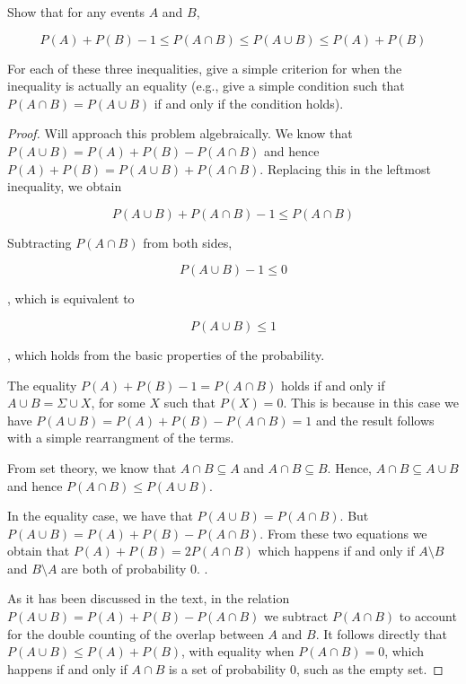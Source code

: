 \begin{exercise}{43}
Show that for any events $A$ and $B$,

$$P(A) + P(B) -1 \leq P(A \cap B) \leq P(A \cup B) \leq P(A) + P(B)$$

For each of these three inequalities, give a simple criterion for when the inequality is
actually an equality (e.g., give a simple condition such that $P(A \cap B) = P (A \cup B)$ if
and only if the condition holds).

\end{exercise}

\begin{proof}
Will approach this problem algebraically. We know that $P(A \cup B) = P(A) + P(B) - P(A \cap B)$ and hence $P(A) + P(B) = P(A\cup B) + P(A \cap B)$. Replacing this in the leftmost inequality, we obtain

$$ P(A\cup B) + P(A \cap B) -1 \leq P(A \cap B) $$

Subtracting $P(A \cap B)$ from both sides,

$$ P(A\cup B) -1 \leq 0 $$

, which is equivalent to 

$$P(A \cup B) \leq 1$$

, which holds from the basic properties of the probability.

The equality $P(A) + P(B) -1 = P(A \cap B)$ holds if and only if $A \cup B = \Sigma \cup X$, for some $X$ such that $P(X) = 0$. This is because in this case we have $P(A \cup B) = P(A) + P(B) - P(A \cap B) = 1$ and the result follows with a simple rearrangment of the terms.

\vspace{1em}

From set theory, we know that $A \cap B \subseteq A$ and $A \cap B \subseteq B$. Hence, $A \cap B \subseteq A \cup B$ and hence $P(A \cap B) \leq P(A \cup B)$.

In the equality case, we have that $P(A \cup B) = P(A \cap B)$. But $P(A \cup B) = P(A) + P(B) - P(A \cap B)$. From these two equations we obtain that $P(A) + P(B) = 2P(A \cap B)$ which happens if and only if $A\setminus B$ and $B\setminus A$ are both of probability $0$. . 

\vspace{1em}

As it has been discussed in the text, in the relation $P(A\cup B) = P(A) + P(B) - P(A \cap B)$ we subtract $P(A \cap B)$ to account for the double counting of the overlap between $A$ and $B$. It follows directly that $P(A  \cup B) \leq P(A) + P(B)$, with equality when $P(A \cap B) = 0$, which happens if and only if $A \cap B$ is a set of probability 0, such as the empty set.

\end{proof}

\newpage

